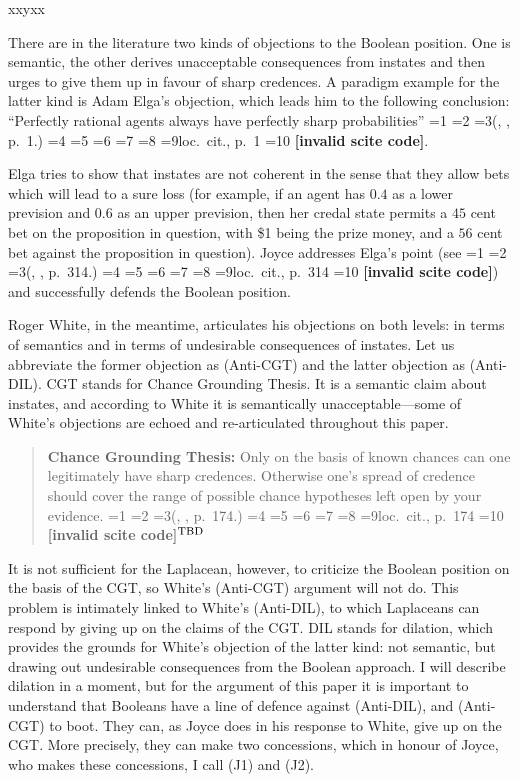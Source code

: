 \documentclass[journal]{IEEEtran}
\newcommand{\qeins}[1]{``#1''}
\newcommand{\fcut}[1]{}
\newcommand{\tbd}[1]{$^{\mbox{\textsc{tbd}}}$}
\newif\ifNumericalOrYear
\newcommand{\PageP}{p.~}
\newcommand{\PageP}{}
\newcommand{\scite}[3]{\ifnum#1=1\ifNumericalOrYear\citep{#2}\else\citeyearpar{#2}\fi\else
\ifnum#1=2\ifNumericalOrYear\citep[#3]{#2}\else\citep[{\PageP}#3]{#2}\fi\else
\ifnum#1=3\ifNumericalOrYear(\citet[#3]{#2})\else(\citeauthor{#2}, \citeyear{#2}, {\PageP}#3.)\fi\else
\ifnum#1=4\ifNumericalOrYear\citet{#2}\else\citet{#2}\fi\else
\ifnum#1=5\ifNumericalOrYear(\citet{#2})\else\citep{#2}\fi\else
\ifnum#1=6\ifNumericalOrYear(\citet[#3]{#2})\else\citep[{\PageP}#3]{#2}\fi\else
\ifnum#1=7\ifNumericalOrYear\citep{#2}\else\citealp{#2}\fi\else
\ifnum#1=8\ifNumericalOrYear\citep[#3]{#2}\else\citealp[{\PageP}#3]{#2}\fi\else
\ifnum#1=9\ifNumericalOrYear\citep[#3]{#2}\else{}loc.\ cit., {\PageP}#3\fi\else
\ifnum#1=10\ifNumericalOrYear\citep{#2}\else\citeyear{#2}\fi\else
\textbf{[invalid scite code]}\fi\fi\fi\fi\fi\fi\fi\fi\fi\fi}
\newenvironment{quotex}{\begin{quote}\begin{footnotesize}}{\end{footnotesize}\end{quote}}
\begin{document}
xxyxx

There\fcut{10} are in the literature two kinds of objections to the
Boolean position. One is semantic, the other derives unacceptable
consequences from instates and then urges to give them up in favour of
sharp credences. A paradigm example for the latter kind is Adam Elga's
objection, which leads him to the following conclusion:
\qeins{Perfectly rational agents always have perfectly sharp
  probabilities} \scite{2}{elga10}{1}.

Elga tries to show that instates are not coherent in the sense that
they allow bets which will lead to a sure loss (for example, if an
agent has $0.4$ as a lower prevision and $0.6$ as an upper prevision,
then her credal state permits a $45$ cent bet on the proposition in
question, with \$1 being the prize money, and a $56$ cent bet against
the proposition in question). Joyce addresses Elga's point (see
\scite{8}{joyce10}{314}) and successfully defends the Boolean
position.

Roger White, in the meantime, articulates his objections on both
levels: in terms of semantics and in terms of undesirable consequences
of instates. Let us abbreviate the former objection as (Anti-CGT) and
the latter objection as (Anti-DIL). CGT stands for Chance Grounding
Thesis. It is a semantic claim about instates, and according to White
it is semantically unacceptable---some of White's objections are
echoed and re-articulated throughout this paper.

\begin{quotex}
  \textbf{Chance Grounding Thesis:} Only on the basis of known chances
  can one legitimately have sharp credences. Otherwise one's spread of
  credence should cover the range of possible chance hypotheses left
  open by your evidence. \scite{2}{white10}{174}\tbd{see Chance
    Grounding Thesis in sonk.org -- maybe go into more detail}
\end{quotex}

It is not sufficient for the Laplacean, however, to criticize the
Boolean position on the basis of the CGT, so White's (Anti-CGT)
argument will not do. This problem is intimately linked to White's
(Anti-DIL), to which Laplaceans can respond by giving up on the claims
of the CGT. DIL stands for dilation, which provides the grounds for
White's objection of the latter kind: not semantic, but drawing out
undesirable consequences from the Boolean approach. I will describe
dilation in a moment, but for the argument of this paper it is
important to understand that Booleans have a line of defence against
(Anti-DIL), and (Anti-CGT) to boot. They can, as Joyce does in his
response to White, give up on the CGT. More precisely, they can make
two concessions, which in honour of Joyce, who makes these
concessions, I call (J1) and (J2). 
\end{document}
